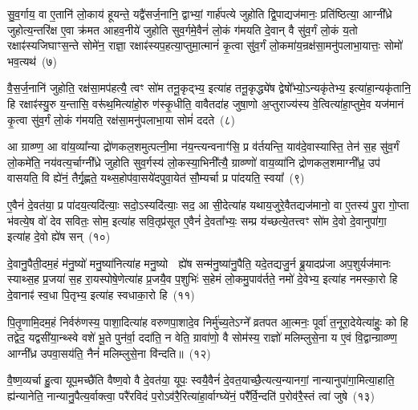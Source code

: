 {\anuvakamend[{स्तु॒ते वि॒न्दते॒ हि वी॑यन्ते प्र॒तीची॑रुद्गा॒त्र उ॒प्यन्ते॒ चतु॑र्दश च}]}%

सु॒व॒र्गाय॒ वा ए॒तानि॑ लो॒काय॑ हूयन्ते॒ यद्वै॑सर्ज॒नानि॒ द्वाभ्यां॒ गार्\mbox{}ह॑पत्ये जुहोति द्वि॒पाद्यज॑मानः॒ प्रति॑ष्ठित्या॒ आग्नी᳚ध्रे जुहोत्य॒न्तरि॑क्ष ए॒वा क्र॑मत आहव॒नीये॑ जुहोति सुव॒र्गमे॒वैनं॑ लो॒कं ग॑मयति दे॒वान् वै सु॑व॒र्गं लो॒कं य॒तो रक्षाꣴ॑स्यजिघाꣳस॒न्ते सोमे॑न॒ राज्ञा॒ रक्षाꣴ॑स्यप॒हत्या॒प्तुमा॒त्मानं॑ कृ॒त्वा सु॑व॒र्गं लो॒कमा॑य॒न्रक्ष॑सा॒मनु॑पलाभा॒यात्तः॒ सोमो॑ भव॒त्यथ॑~(७)

वै॒स॒र्ज॒नानि॑ जुहोति॒ रक्ष॑सा॒मप॑हत्यै॒ त्वꣳ सो॑म तनू॒कृद्भ्य॒ इत्या॑ह तनू॒कृद्ध्ये॑ष द्वेषो᳚भ्यो॒\-ऽन्यकृ॑तेभ्य॒ इत्या॑हा॒न्यकृ॑तानि॒ हि रक्षाꣴ॑स्यु॒रु य॒न्तासि॒ वरू॑थ॒मित्या॑हो॒रु ण॑स्कृ॒धीति॒ वावैतदा॑ह जुषा॒णो अ॒प्तुराज्य॑स्य वे॒त्वित्या॑हा॒प्तुमे॒व यज॑मानं कृ॒त्वा सु॑व॒र्गं लो॒कं ग॑मयति॒ रक्ष॑सा॒मनु॑पलाभा॒या सोमं॑ ददते~(८)

आ ग्राव्ण्ण॒ आ वा॑य॒व्या᳚न्या द्रो॑णकल॒शमुत्पत्नी॒मा न॑य॒न्त्यन्वनाꣳ॑सि॒ प्र व॑र्तयन्ति॒ याव॑दे॒वास्यास्ति॒ तेन॑ स॒ह सु॑व॒र्गं लो॒कमे॑ति॒ नय॑वत्य॒र्चाग्नी᳚ध्रे जुहोति सुव॒र्गस्य॑ लो॒कस्या॒भिनी᳚त्यै॒ ग्राव्ण्णो॑ वाय॒व्या॑नि द्रोणकल॒शमाग्नी᳚ध्र॒ उप॑ वासयति॒ वि ह्ये॑नं॒ तैर्गृ॒ह्णते॒ यथ्स॒होप॑वा॒सये॑दपुवा॒येत॑ सौ॒म्यर्चा प्र पा॑दयति॒ स्वया᳚~(९)

ए॒वैनं॑ दे॒वत॑या॒ प्र पा॑दय॒त्यदि॑त्याः॒ सदो॒\-ऽस्यदि॑त्याः॒ सद॒ आ सी॒देत्या॑ह यथाय॒जुरे॒वैतद्यज॑मानो॒ वा ए॒तस्य॑ पु॒रा गो॒प्ता भ॑वत्ये॒ष वो॑ देव सवितः॒ सोम॒ इत्या॑ह सवि॒तृप्र॑सूत ए॒वैनं॑ दे॒वता᳚भ्यः॒ सम्प्र य॑च्छत्ये॒तत्त्वꣳ सो॑म दे॒वो दे॒वानुपा॑गा॒ इत्या॑ह दे॒वो ह्ये॑ष सन्~(१०)

दे॒वानु॒पैती॒दम॒हं म॑नु॒ष्यो॑ मनु॒ष्या॑नित्या॑ह मनु॒ष्यो  ह्ये॑ष सन्म॑नु॒ष्या॑नु॒पैति॒ यदे॒तद्यजु॒र्न ब्रू॒यादप्र॑जा अप॒शुर्यज॑मानः स्याथ्स॒ह प्र॒जया॑ स॒ह रा॒यस्पोषे॒णेत्या॑ह प्र॒जयै॒व प॒शुभिः॑ स॒हेमं लो॒कमु॒पाव॑र्तते॒ नमो॑ दे॒वेभ्य॒ इत्या॑ह नमस्का॒रो हि दे॒वानाꣴ॑ स्व॒धा पि॒तृभ्य॒ इत्या॑ह स्वधाका॒रो हि~(११)

पि॒तृ॒णामि॒दम॒हं निर्वरु॑णस्य॒ पाशा॒दित्या॑ह वरुणपा॒शादे॒व निर्मु॑च्य॒ते\-ऽग्ने᳚ व्रतपत आ॒त्मनः॒ पूर्वा॑ त॒नूरा॒देयेत्या॑हुः॒ को हि तद्वेद॒ यद्वसी॑या॒न्थ्स्वे वशे॑ भू॒ते पुन॑र्वा॒ ददा॑ति॒ न वेति॒ ग्रावा॑णो॒ वै सोम॑स्य॒ राज्ञो॑ मलिम्लुसे॒ना य ए॒वं वि॒द्वान्ग्राव्ण्ण॒ आग्नी᳚ध्र उपवा॒सय॑ति॒ नैनं॑ मलिम्लुसे॒ना वि॑न्दति॥~(१२)

{\anuvakamend[{अथ॑ ददते॒ स्वया॒ सन्थ्स्व॑धाका॒रो हि वि॑न्दति}]}%

वै॒ष्ण॒व्यर्चा हु॒त्वा यूप॒मच्छै॑ति वैष्ण॒वो वै दे॒वत॑या॒ यूपः॒ स्वयै॒वैनं॑ दे॒वत॒याच्छै॒त्यत्य॒न्यानगां॒ नान्यानुपा॑गा॒मित्या॒हाति॒ ह्य॑न्यानेति॒ नान्यानु॒पैत्य॒र्वाक्त्वा॒ परै॑रविदं प॒रो\-ऽव॑रै॒रित्या॑हा॒र्वाग्घ्ये॑नं॒ परै᳚र्वि॒न्दति॑ प॒रोव॑रै॒स्तं त्वा॑ जुषे~(१३)

